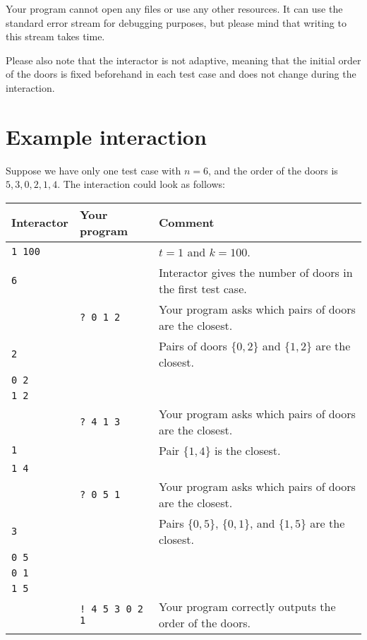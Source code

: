 Your program cannot open any files or use any other resources. It can use the standard
error stream for debugging purposes, but please mind that writing to this
stream takes time.

Please also note that the interactor is not adaptive, meaning that the initial order of the doors
is fixed beforehand in each test case and does not change during the interaction.

\section{Example interaction}
Suppose we have only one test case with $n=6$, and the order of the doors is $5, 3, 0, 2, 1, 4$.
The interaction could look as follows:

\begin{center}
\begin{tabular}{|l|l|l|}
\hline
\textbf{Interactor} & \textbf{Your program} & \textbf{Comment} \\
\hline
\texttt{1 100} & & $t=1$ and $k=100$. \\ \hline
\texttt{6} & & Interactor gives the number of doors in the first test case. \\ \hline
& \texttt{? 0 1 2} & Your program asks which pairs of doors are the closest. \\ \hline
\texttt{2} & & Pairs of doors $\{0,2\}$ and $\{1,2\}$ are the closest. \\
\texttt{0 2} & & \\
\texttt{1 2} & & \\ \hline
& \texttt{? 4 1 3} & Your program asks which pairs of doors are the closest. \\ \hline
\texttt{1} & & Pair $\{1,4\}$ is the closest. \\
\texttt{1 4} & & \\ \hline
& \texttt{? 0 5 1} & Your program asks which pairs of doors are the closest. \\ \hline
\texttt{3} & & Pairs $\{0,5\}$, $\{0,1\}$, and $\{1,5\}$ are the closest. \\
\texttt{0 5} & & \\
\texttt{0 1} & & \\
\texttt{1 5} & & \\ \hline
& \texttt{! 4 5 3 0 2 1} & Your program correctly outputs the order of the doors. \\ \hline
\end{tabular}
\end{center}

